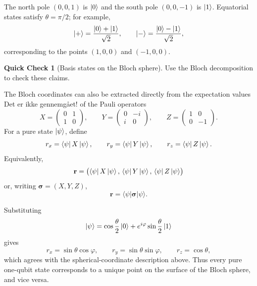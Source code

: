 \documentclass[11pt,a4paper]{article}
\theoremstyle{definition}
\newtheorem{quickCheck}{Quick Check}[section]
\begin{document}
The north pole $(0,0,1)$ is $\left| 0 \right\rangle$ and the south pole $(0,0,-1)$ is $\left| 1 \right\rangle$.
Equatorial states satisfy $\theta=\pi/2$; for example,
\[
  \left| + \right\rangle =
  \frac{\left| 0 \right\rangle+\left| 1 \right\rangle}{\sqrt2},
  \qquad
  \left| - \right\rangle =
  \frac{\left| 0 \right\rangle-\left| 1 \right\rangle}{\sqrt2},
\]
corresponding to the points $(1,0,0)$ and $(-1,0,0)$.

\begin{quickCheck}[Basis states on the Bloch sphere]
Use the Bloch decomposition to check these claims.
\end{quickCheck}

The Bloch coordinates can also be extracted directly from the expectation
values {\color{red}Det er ikke gennemgået!} of the Pauli operators
\[
  X=
  \begin{pmatrix}0&1\\1&0\end{pmatrix},
  \qquad
  Y=
  \begin{pmatrix}0&-i\\i&0\end{pmatrix},
  \qquad
  Z=
  \begin{pmatrix}1&0\\0&-1\end{pmatrix}.
\]
For a pure state $\left| \psi \right\rangle$, define
\[
  r_x=\left\langle \psi \right| X\left| \psi \right\rangle,
  \qquad
  r_y=\left\langle \psi \right| Y\left| \psi \right\rangle,
  \qquad
  r_z=\left\langle \psi \right| Z\left| \psi \right\rangle.
\]
Equivalently,
\[
  \mathbf r
  =
  \bigl(
    \left\langle \psi \right| X\left| \psi \right\rangle,\,
    \left\langle \psi \right| Y\left| \psi \right\rangle,\,
    \left\langle \psi \right| Z\left| \psi \right\rangle
  \bigr)
\]
or, writing $\boldsymbol{\sigma}=(X,Y,Z)$,
\[
  \mathbf r
  =
  \langle \psi|\boldsymbol{\sigma}|\psi\rangle .
\]

Substituting
\[
  \left| \psi \right\rangle=
  \cos\frac{\theta}{2}\left| 0 \right\rangle
  +e^{i\varphi}\sin\frac{\theta}{2}\left| 1 \right\rangle
\]
gives
\[
  r_x=\sin\theta\cos\varphi,
  \qquad
  r_y=\sin\theta\sin\varphi,
  \qquad
  r_z=\cos\theta,
\]
which agrees with the spherical-coordinate description above.  Thus every
pure one-qubit state corresponds to a unique point on the surface of the
Bloch sphere, and vice versa.
\end{document}

